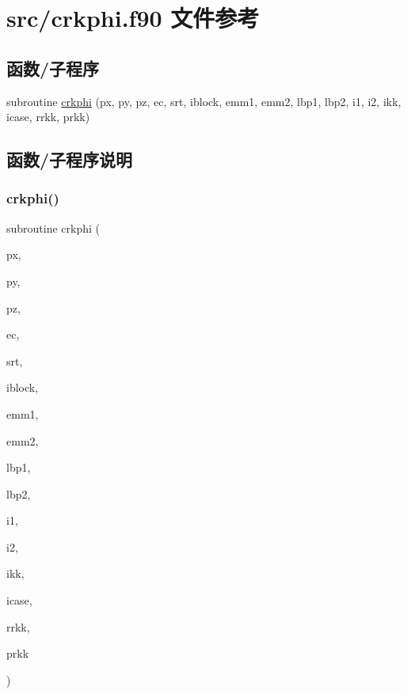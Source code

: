 \hypertarget{crkphi_8f90}{}\section{src/crkphi.f90 文件参考}
\label{crkphi_8f90}
\subsection*{函数/子程序}
\begin{DoxyCompactItemize}
\item 
subroutine \mbox{\hyperlink{crkphi_8f90_aeb60c8b31853478ff05088c42ef409ce}{crkphi}} (px, py, pz, ec, srt, iblock, emm1, emm2, lbp1, lbp2, i1, i2, ikk, icase, rrkk, prkk)
\end{DoxyCompactItemize}


\subsection{函数/子程序说明}
\mbox{\label{crkphi_8f90_aeb60c8b31853478ff05088c42ef409ce}} 
\subsubsection{\texorpdfstring{crkphi()}{crkphi()}}
{\footnotesize\ttfamily subroutine crkphi (\begin{DoxyParamCaption}\item[{}]{px,  }\item[{}]{py,  }\item[{}]{pz,  }\item[{}]{ec,  }\item[{}]{srt,  }\item[{}]{iblock,  }\item[{}]{emm1,  }\item[{}]{emm2,  }\item[{}]{lbp1,  }\item[{}]{lbp2,  }\item[{}]{i1,  }\item[{}]{i2,  }\item[{}]{ikk,  }\item[{}]{icase,  }\item[{}]{rrkk,  }\item[{}]{prkk }\end{DoxyParamCaption})}



